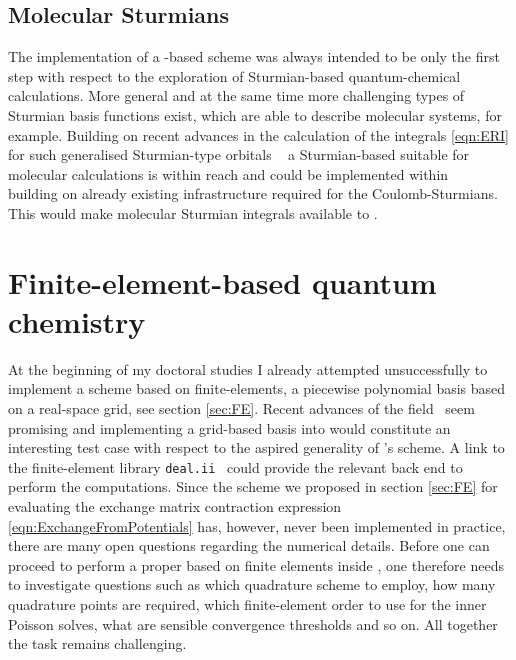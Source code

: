 \subsection{Molecular Sturmians}
\label{sec:MolecularSturmian}
The implementation of a \CS-based \SCF scheme was always intended
to be only the first step with respect to the exploration
of Sturmian-based quantum-chemical calculations.
More general and at the same time more challenging types of Sturmian basis
functions exist,
which are able to describe molecular systems, for example.
Building on recent advances in the calculation of the \ERI integrals
\eqref{eqn:ERI} for such generalised Sturmian-type orbitals%
~\cite{Avery2006,Avery2011PhD,Avery2011,Morales2016,Avery2017,Randazzo2015,Granados2016}
a Sturmian-based \HF suitable for molecular calculations is within reach
and could be implemented within \sturmint~\cite{sturmintWeb}
building on already existing infrastructure required for the Coulomb-Sturmians.
This would make molecular Sturmian integrals available to \molsturm.

\section{Finite-element-based quantum chemistry}
\label{sec:newFE}
At the beginning of my doctoral studies I already attempted
unsuccessfully to implement a \HF scheme based on finite-elements,
a piecewise polynomial basis based on a real-space grid,
see section \vref{sec:FE}.
Recent advances of the field~\cite{Frediani2015,Toivanen2015,Davydov2015,Boffi2016}
seem promising and
implementing a grid-based basis into \molsturm
would constitute an interesting test case with respect to the aspired generality
of \molsturm's \SCF scheme.
A link to the finite-element library \texttt{deal.ii}~\cite{Arndt2017}
could provide the relevant back end to perform the computations.
Since the scheme we proposed in section \ref{sec:FE}
for evaluating the exchange matrix contraction
expression \eqref{eqn:ExchangeFromPotentials}
has, however, never been implemented in practice,
there are many open questions regarding the numerical details.
Before one can proceed to perform a proper \SCF based on finite elements inside \molsturm,
one therefore needs to investigate questions such as
which quadrature scheme to employ,
how many quadrature points are required,
which finite-element order to use for the inner Poisson solves,
what are sensible convergence thresholds and so on.
All together the task remains challenging.

